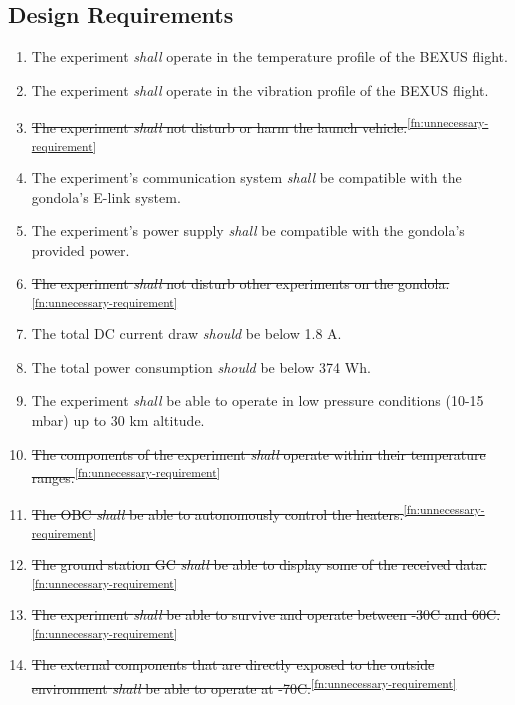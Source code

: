 \subsection{Design Requirements}

\begin{enumerate}[label=D.\arabic*]
    \item The experiment \textit{shall} operate in the temperature profile of the BEXUS flight.
    \item The experiment \textit{shall} operate in the vibration profile of the BEXUS flight.
    \item \st{The experiment \textit{shall} not disturb or harm the launch vehicle.}\textsuperscript{\ref{fn:unnecessary-requirement}}
    \item The experiment's communication system \textit{shall} be compatible with the gondola's E-link system.
    \item The experiment's power supply \textit{shall} be compatible with the gondola's provided power.
    \item \st{The experiment \textit{shall} not disturb other experiments on the gondola.}\textsuperscript{\ref{fn:unnecessary-requirement}}
    \item The total DC current draw \textit{should} be below 1.8 A.
    \item The total power consumption \textit{should} be below 374 Wh.
    \item The experiment \textit{shall} be able to operate in low pressure conditions (10-15 mbar) up to 30 km altitude.
    \item \st{The components of the experiment \textit{shall} operate within their temperature ranges.}\textsuperscript{\ref{fn:unnecessary-requirement}}
    \item \st{The OBC \textit{shall} be able to autonomously control the heaters.}\textsuperscript{\ref{fn:unnecessary-requirement}}
    \item \st{The ground station GC \textit{shall} be able to display some of the received data.}\textsuperscript{\ref{fn:unnecessary-requirement}}
    \item \st{The experiment \textit{shall} be able to survive and operate between -30\degree C and 60\degree C.}\textsuperscript{\ref{fn:unnecessary-requirement}}
    \item \st{The external components that are directly exposed to the outside environment \textit{shall} be able to operate at -70\degree C.}\textsuperscript{\ref{fn:unnecessary-requirement}}

\end{enumerate}
